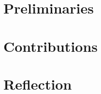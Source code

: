 \documentclass[11pt]{report}%
\theoremstyle{definition}
\theoremstyle{remark}
\begin{document}



\tableofcontents

\listoffigures

\newpage


\part{Preliminaries}



\part{Contributions}





\part{Reflection}





\end{document}

